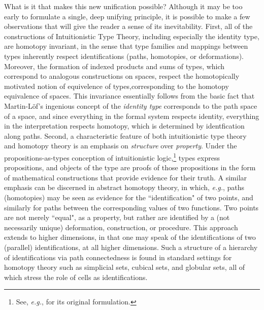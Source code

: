 \documentclass[11pt]{article}
\begin{document}
What is it that makes this new unification possible?  Although it may be too
early to formulate a single, deep unifying principle, it is possible to make a
few observations that will give the reader a sense of its inevitability.  First,
all of the constructions of Intuitionistic Type Theory, including especially
the %
identity type, are homotopy invariant, in the sense that type families and
mappings between types inherently respect identifications (paths, homotopies, or
deformations).  Moreover, the formation of indexed products and sums of types,
which correspond to analogous constructions on spaces, respect the homotopically
motivated notion of equivelence of types,corresponding to the homotopy
equivalence of spaces.  This invariance essentially follows from the basic fact
that Martin-L\"{o}f's ingenious concept of the \emph{identity type} corresponds
to the path space of a space, and since everything in the formal system respects
identity, everything in the interpretation respects homotopy, which is
determined by identfication along paths.  Second, a characteristic feature of
both intuitionistic type theory and homotopy theory is an emphasis on
\emph{structure} over \emph{property}.  Under the propositions-as-types
conception of intuitionistic logic,\footnote{See, \textit{e.g.},
  \cite{Howard:PAT} for its original formulation.} types express propositions,
and objects of the type are proofs of those propositions in the form of
mathematical constructions that provide evidence for their truth.  A similar
emphasis can be discerned in abstract homotopy theory, in which, \textit{e.g.},
paths (homotopies) may be seen as evidence for the ``identification" of two
points, and similarly for paths between the corresponding values of two
functions.  Two points are not merely ``equal", as a property, but rather are
identified by a (not necessarily unique) deformation, construction, or
procedure.  This approach extends to higher dimensions, in that one may speak of
the identifications of two (parallel) identifications, at all higher dimensions.
Such a structure of a hierarchy of identifications via path connectedness is
found in standard settings for homotopy theory such as simplicial sets, cubical
sets, and globular sets, all of which stress the role of cells as
identifications.
\end{document}
